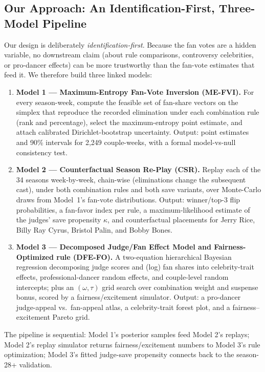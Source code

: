 \documentclass[11pt]{article}
\begin{document}
\subsection{Our Approach: An Identification-First, Three-Model Pipeline}

Our design is deliberately \emph{identification-first}. Because the fan votes are a
hidden variable, no downstream claim (about rule comparisons, controversy celebrities, or
pro-dancer effects) can be more trustworthy than the fan-vote estimates that feed it.
We therefore build three linked models:

\begin{enumerate}[itemsep=2pt]
  \item \textbf{Model 1 --- Maximum-Entropy Fan-Vote Inversion (ME-FVI).} For every
        season-week, compute the feasible set of fan-share vectors on the simplex that
        reproduce the recorded elimination under each combination rule (rank and
        percentage), select the maximum-entropy point estimate, and attach calibrated
        Dirichlet-bootstrap uncertainty. Output: point estimates and 90\% intervals for
        2{,}249 couple-weeks, with a formal model-vs-null consistency test.
  \item \textbf{Model 2 --- Counterfactual Season Re-Play (CSR).} Replay each of the 34
        seasons week-by-week, chain-wise (eliminations change the subsequent cast), under
        both combination rules and both save variants, over Monte-Carlo draws from
        Model~1's fan-vote distributions. Output: winner/top-3 flip probabilities, a
        fan-favor index per rule, a maximum-likelihood estimate of the judges' save
        propensity $\kappa$, and counterfactual placements for Jerry Rice, Billy Ray
        Cyrus, Bristol Palin, and Bobby Bones.
  \item \textbf{Model 3 --- Decomposed Judge/Fan Effect Model and Fairness-Optimized
        rule (DFE-FO).} A two-equation hierarchical Bayesian regression decomposing judge
        scores and (log) fan shares into celebrity-trait effects, professional-dancer
        random effects, and couple-level random intercepts; plus an $(\omega,\tau)$ grid
        search over combination weight and suspense bonus, scored by a
        fairness/excitement simulator. Output: a pro-dancer judge-appeal vs.\ fan-appeal
        atlas, a celebrity-trait forest plot, and a fairness--excitement Pareto grid.
\end{enumerate}

The pipeline is sequential: Model 1's posterior samples feed Model 2's replays; Model 2's
replay simulator returns fairness/excitement numbers to Model 3's rule optimization;
Model 3's fitted judge-save propensity connects back to the season-28+ validation.
\end{document}
